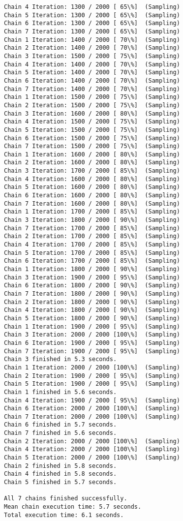 \documentclass[11pt]{article}
\begin{document}
\begin{Verbatim}[commandchars=\\\{\}]
Chain 4 Iteration: 1300 / 2000 [ 65\%]  (Sampling)
Chain 5 Iteration: 1300 / 2000 [ 65\%]  (Sampling)
Chain 6 Iteration: 1300 / 2000 [ 65\%]  (Sampling)
Chain 7 Iteration: 1300 / 2000 [ 65\%]  (Sampling)
Chain 1 Iteration: 1400 / 2000 [ 70\%]  (Sampling)
Chain 2 Iteration: 1400 / 2000 [ 70\%]  (Sampling)
Chain 3 Iteration: 1500 / 2000 [ 75\%]  (Sampling)
Chain 4 Iteration: 1400 / 2000 [ 70\%]  (Sampling)
Chain 5 Iteration: 1400 / 2000 [ 70\%]  (Sampling)
Chain 6 Iteration: 1400 / 2000 [ 70\%]  (Sampling)
Chain 7 Iteration: 1400 / 2000 [ 70\%]  (Sampling)
Chain 1 Iteration: 1500 / 2000 [ 75\%]  (Sampling)
Chain 2 Iteration: 1500 / 2000 [ 75\%]  (Sampling)
Chain 3 Iteration: 1600 / 2000 [ 80\%]  (Sampling)
Chain 4 Iteration: 1500 / 2000 [ 75\%]  (Sampling)
Chain 5 Iteration: 1500 / 2000 [ 75\%]  (Sampling)
Chain 6 Iteration: 1500 / 2000 [ 75\%]  (Sampling)
Chain 7 Iteration: 1500 / 2000 [ 75\%]  (Sampling)
Chain 1 Iteration: 1600 / 2000 [ 80\%]  (Sampling)
Chain 2 Iteration: 1600 / 2000 [ 80\%]  (Sampling)
Chain 3 Iteration: 1700 / 2000 [ 85\%]  (Sampling)
Chain 4 Iteration: 1600 / 2000 [ 80\%]  (Sampling)
Chain 5 Iteration: 1600 / 2000 [ 80\%]  (Sampling)
Chain 6 Iteration: 1600 / 2000 [ 80\%]  (Sampling)
Chain 7 Iteration: 1600 / 2000 [ 80\%]  (Sampling)
Chain 1 Iteration: 1700 / 2000 [ 85\%]  (Sampling)
Chain 3 Iteration: 1800 / 2000 [ 90\%]  (Sampling)
Chain 7 Iteration: 1700 / 2000 [ 85\%]  (Sampling)
Chain 2 Iteration: 1700 / 2000 [ 85\%]  (Sampling)
Chain 4 Iteration: 1700 / 2000 [ 85\%]  (Sampling)
Chain 5 Iteration: 1700 / 2000 [ 85\%]  (Sampling)
Chain 6 Iteration: 1700 / 2000 [ 85\%]  (Sampling)
Chain 1 Iteration: 1800 / 2000 [ 90\%]  (Sampling)
Chain 3 Iteration: 1900 / 2000 [ 95\%]  (Sampling)
Chain 6 Iteration: 1800 / 2000 [ 90\%]  (Sampling)
Chain 7 Iteration: 1800 / 2000 [ 90\%]  (Sampling)
Chain 2 Iteration: 1800 / 2000 [ 90\%]  (Sampling)
Chain 4 Iteration: 1800 / 2000 [ 90\%]  (Sampling)
Chain 5 Iteration: 1800 / 2000 [ 90\%]  (Sampling)
Chain 1 Iteration: 1900 / 2000 [ 95\%]  (Sampling)
Chain 3 Iteration: 2000 / 2000 [100\%]  (Sampling)
Chain 6 Iteration: 1900 / 2000 [ 95\%]  (Sampling)
Chain 7 Iteration: 1900 / 2000 [ 95\%]  (Sampling)
Chain 3 finished in 5.3 seconds.
Chain 1 Iteration: 2000 / 2000 [100\%]  (Sampling)
Chain 2 Iteration: 1900 / 2000 [ 95\%]  (Sampling)
Chain 5 Iteration: 1900 / 2000 [ 95\%]  (Sampling)
Chain 1 finished in 5.6 seconds.
Chain 4 Iteration: 1900 / 2000 [ 95\%]  (Sampling)
Chain 6 Iteration: 2000 / 2000 [100\%]  (Sampling)
Chain 7 Iteration: 2000 / 2000 [100\%]  (Sampling)
Chain 6 finished in 5.7 seconds.
Chain 7 finished in 5.6 seconds.
Chain 2 Iteration: 2000 / 2000 [100\%]  (Sampling)
Chain 4 Iteration: 2000 / 2000 [100\%]  (Sampling)
Chain 5 Iteration: 2000 / 2000 [100\%]  (Sampling)
Chain 2 finished in 5.8 seconds.
Chain 4 finished in 5.8 seconds.
Chain 5 finished in 5.7 seconds.

All 7 chains finished successfully.
Mean chain execution time: 5.7 seconds.
Total execution time: 6.1 seconds.

    \end{Verbatim}
\end{document}
